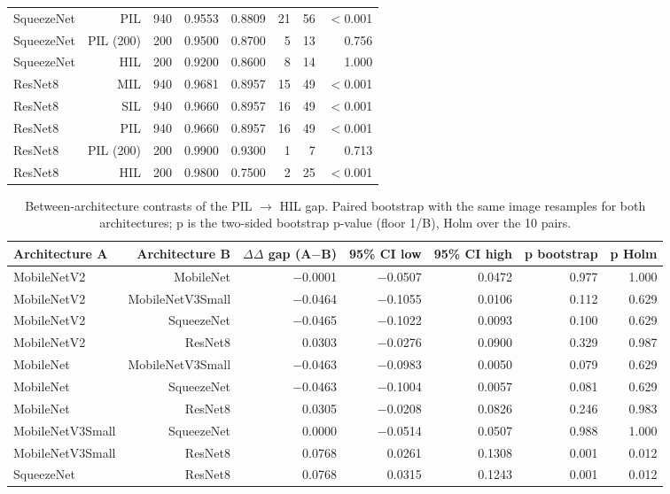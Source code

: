 \begin{table}[htbp]
\begin{tabular}{lrrrrrrr}
SqueezeNet & PIL & 940 & 0.9553 & 0.8809 & 21 & 56 & $<$0.001 \\
SqueezeNet & PIL (200) & 200 & 0.9500 & 0.8700 & 5 & 13 & 0.756 \\
SqueezeNet & HIL & 200 & 0.9200 & 0.8600 & 8 & 14 & 1.000 \\
ResNet8 & MIL & 940 & 0.9681 & 0.8957 & 15 & 49 & $<$0.001 \\
ResNet8 & SIL & 940 & 0.9660 & 0.8957 & 16 & 49 & $<$0.001 \\
ResNet8 & PIL & 940 & 0.9660 & 0.8957 & 16 & 49 & $<$0.001 \\
ResNet8 & PIL (200) & 200 & 0.9900 & 0.9300 & 1 & 7 & 0.713 \\
ResNet8 & HIL & 200 & 0.9800 & 0.7500 & 2 & 25 & $<$0.001 \\
\bottomrule
\end{tabular}
\end{table}

\begin{table}[htbp]
\centering
\scriptsize
\caption{Between-architecture contrasts of the PIL $\rightarrow$ HIL gap. Paired bootstrap with the same image resamples for both architectures; p is the two-sided bootstrap p-value (floor 1/B), Holm over the 10 pairs.}
\label{tab:ladder6}
\begin{tabular}{lrrrrrr}
\toprule
Architecture A & Architecture B & $\Delta$$\Delta$ gap (A$-$B) & 95\% CI low & 95\% CI high & p bootstrap & p Holm \\
\midrule
MobileNetV2 & MobileNet & $-$0.0001 & $-$0.0507 & 0.0472 & 0.977 & 1.000 \\
MobileNetV2 & MobileNetV3Small & $-$0.0464 & $-$0.1055 & 0.0106 & 0.112 & 0.629 \\
MobileNetV2 & SqueezeNet & $-$0.0465 & $-$0.1022 & 0.0093 & 0.100 & 0.629 \\
MobileNetV2 & ResNet8 & 0.0303 & $-$0.0276 & 0.0900 & 0.329 & 0.987 \\
MobileNet & MobileNetV3Small & $-$0.0463 & $-$0.0983 & 0.0050 & 0.079 & 0.629 \\
MobileNet & SqueezeNet & $-$0.0463 & $-$0.1004 & 0.0057 & 0.081 & 0.629 \\
MobileNet & ResNet8 & 0.0305 & $-$0.0208 & 0.0826 & 0.246 & 0.983 \\
MobileNetV3Small & SqueezeNet & 0.0000 & $-$0.0514 & 0.0507 & 0.988 & 1.000 \\
MobileNetV3Small & ResNet8 & 0.0768 & 0.0261 & 0.1308 & 0.001 & 0.012 \\
SqueezeNet & ResNet8 & 0.0768 & 0.0315 & 0.1243 & 0.001 & 0.012 \\
\bottomrule
\end{tabular}
\end{table}


